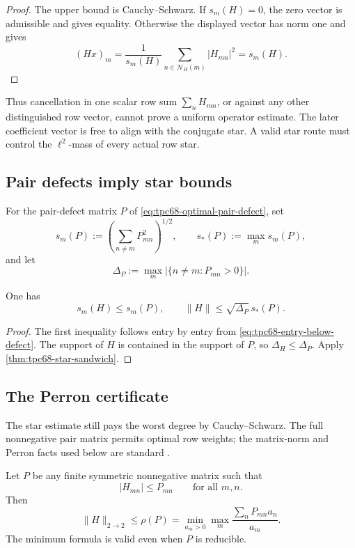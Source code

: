 \begin{proof}
The upper bound is Cauchy--Schwarz.  If \(s_m(H)=0\), the zero vector is
admissible and gives equality.  Otherwise the displayed vector has norm one
and gives
\[
 (Hx)_m=\frac1{s_m(H)}
 \sum_{n\in\mathcal N_H(m)}|H_{mn}|^2=s_m(H).
\]
\end{proof}

Thus cancellation in one scalar row sum
\(\sum_nH_{mn}\), or against any other distinguished row vector, cannot
prove a uniform operator estimate.  The later coefficient vector is free
to align with the conjugate star.  A valid star route must control the
\(\ell^2\)-mass of every actual row star.

\subsection{Pair defects imply star bounds}

For the pair-defect matrix \(P\) of
\eqref{eq:tpc68-optimal-pair-defect}, set
\[
 s_m(P):=\left(\sum_{n\ne m}P_{mn}^2\right)^{1/2},
 \qquad s_*(P):=\max_m s_m(P),
\]
and let
\[
 \Delta_P:=\max_m|\{n\ne m:P_{mn}>0\}|.
\]

\begin{corollary}
\label{cor:tpc68-pair-to-star}
One has
\begin{equation}
 s_m(H)\le s_m(P),
 \qquad
 \|H\|\le\sqrt{\Delta_P}\,s_*(P).
 \label{eq:tpc68-pair-to-star}
\end{equation}
\end{corollary}

\begin{proof}
The first inequality follows entry by entry from
\eqref{eq:tpc68-entry-below-defect}.  The support of \(H\) is contained in
the support of \(P\), so \(\Delta_H\le\Delta_P\).  Apply
\cref{thm:tpc68-star-sandwich}.
\end{proof}

\subsection{The Perron certificate}

The star estimate still pays the worst degree by Cauchy--Schwarz.  The full
nonnegative pair matrix permits optimal row weights; the matrix-norm and
Perron facts used below are standard \citep{HornJohnson2013}.

\begin{theorem}
\label{thm:tpc68-Perron-certificate}
Let \(P\) be any finite symmetric nonnegative matrix such that
\[
 |H_{mn}|\le P_{mn}
 \qquad\text{for all }m,n.
\]
Then
\begin{equation}
 \boxed{
 \|H\|_{2\to2}
 \le\rho(P)
 =
 \min_{a_m>0}
 \max_m\frac{\sum_nP_{mn}a_n}{a_m}.}
 \label{eq:tpc68-Perron-CW}
\end{equation}
The minimum formula is valid even when \(P\) is reducible.
\end{theorem}

